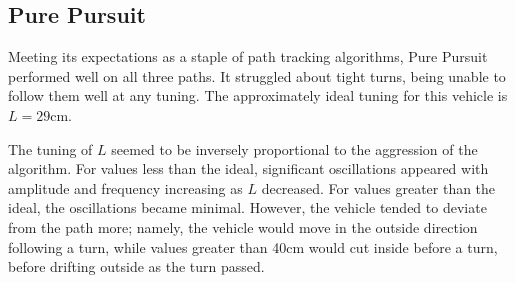 \documentclass[12pt]{article}
\begin{document}
\begin{flushleft}
\begin{figure}[H]
\endminipage
\end{figure}


\subsection{Pure Pursuit}

Meeting its expectations as a staple of path tracking algorithms, Pure Pursuit performed well on all three paths. It struggled about tight turns, being unable to follow them well at any tuning. The approximately ideal tuning for this vehicle is $L=29$cm.

The tuning of $L$ seemed to be inversely proportional to the aggression of the algorithm. For values less than the ideal, significant oscillations appeared with amplitude and frequency increasing as $L$ decreased. For values greater than the ideal, the oscillations became minimal. However, the vehicle tended to deviate from the path more; namely, the vehicle would move in the outside direction following a turn, while values greater than 40cm would cut inside before a turn, before drifting outside as the turn passed.


\end{flushleft}
\end{document}
